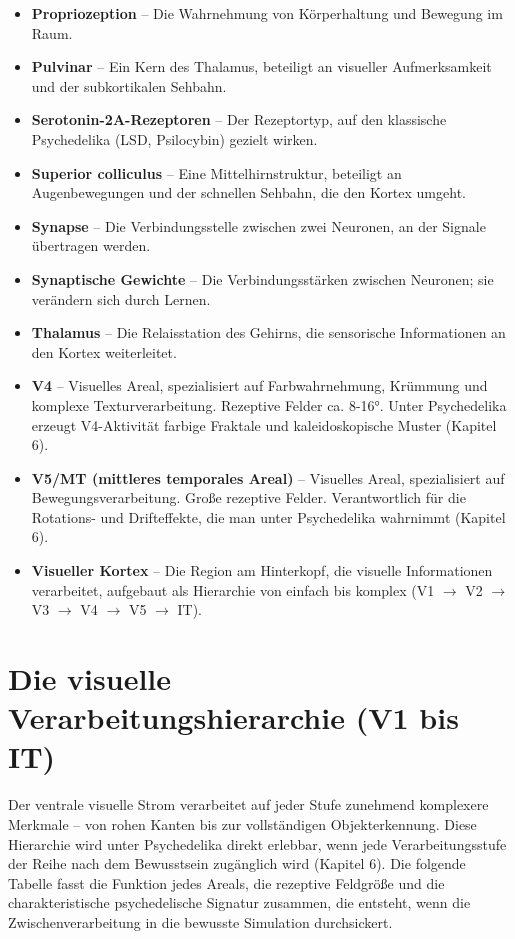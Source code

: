 \documentclass[11pt, twoside, openright]{book}
\begin{document}
\begin{itemize}
  \item \textbf{Propriozeption} -- Die Wahrnehmung von Körperhaltung und Bewegung im Raum.
  \item \textbf{Pulvinar} -- Ein Kern des Thalamus, beteiligt an visueller Aufmerksamkeit und der subkortikalen Sehbahn.
  \item \textbf{Serotonin-2A-Rezeptoren} -- Der Rezeptortyp, auf den klassische Psychedelika (LSD, Psilocybin) gezielt wirken.
  \item \textbf{Superior colliculus} -- Eine Mittelhirnstruktur, beteiligt an Augenbewegungen und der schnellen Sehbahn, die den Kortex umgeht.
  \item \textbf{Synapse} -- Die Verbindungsstelle zwischen zwei Neuronen, an der Signale übertragen werden.
  \item \textbf{Synaptische Gewichte} -- Die Verbindungsstärken zwischen Neuronen; sie verändern sich durch Lernen.
  \item \textbf{Thalamus} -- Die Relaisstation des Gehirns, die sensorische Informationen an den Kortex weiterleitet.
  \item \textbf{V4} -- Visuelles Areal, spezialisiert auf Farbwahrnehmung, Krümmung und komplexe Texturverarbeitung. Rezeptive Felder ca. 8-16°. Unter Psychedelika erzeugt V4-Aktivität farbige Fraktale und kaleidoskopische Muster (Kapitel 6).
  \item \textbf{V5/MT (mittleres temporales Areal)} -- Visuelles Areal, spezialisiert auf Bewegungsverarbeitung. Große rezeptive Felder. Verantwortlich für die Rotations- und Drifteffekte, die man unter Psychedelika wahrnimmt (Kapitel 6).
  \item \textbf{Visueller Kortex} -- Die Region am Hinterkopf, die visuelle Informationen verarbeitet, aufgebaut als Hierarchie von einfach bis komplex (V1 $\rightarrow$ V2 $\rightarrow$ V3 $\rightarrow$ V4 $\rightarrow$ V5 $\rightarrow$ IT).
\end{itemize}

\section*{Die visuelle Verarbeitungshierarchie (V1 bis IT)}

Der ventrale visuelle Strom verarbeitet auf jeder Stufe zunehmend komplexere Merkmale -- von rohen Kanten bis zur vollständigen Objekterkennung. Diese Hierarchie wird unter Psychedelika direkt erlebbar, wenn jede Verarbeitungsstufe der Reihe nach dem Bewusstsein zugänglich wird (Kapitel 6). Die folgende Tabelle fasst die Funktion jedes Areals, die rezeptive Feldgröße und die charakteristische psychedelische Signatur zusammen, die entsteht, wenn die Zwischenverarbeitung in die bewusste Simulation durchsickert.
\end{document}
